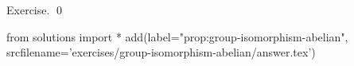 
\begin{prop}
  \label{prop:group-isomorphism-abelian}
  
\end{prop}
\proof
Exercise.
\qed
\begin{python0}
from solutions import *
add(label="prop:group-isomorphism-abelian",
    srcfilename='exercises/group-isomorphism-abelian/answer.tex') 
\end{python0}
